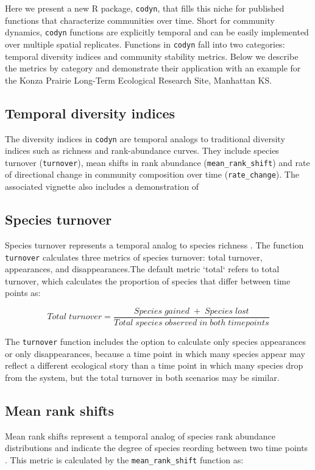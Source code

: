 \documentclass[11pt]{article}
\begin{document}
Here we present a new R package, \texttt{codyn}, that fills this niche for published functions that characterize communities over time. Short for community dynamics, \texttt{codyn} functions are explicitly temporal and can be easily implemented over multiple spatial replicates. Functions in \texttt{codyn} fall into two categories: temporal diversity indices and community stability metrics. Below we describe the metrics by category and demonstrate their application with an example for the Konza Prairie Long-Term Ecological Research Site, Manhattan KS.

\subsection{Temporal diversity indices}

The diversity indices in \texttt{codyn} are temporal analogs to traditional diversity indices such as richness and rank-abundance curves. They include species turnover (\texttt{turnover}), mean shifts in rank abundance (\texttt{mean\_rank\_shift}) \cite{Collins2008} and rate of directional change in community composition over time (\texttt{rate\_change}). The associated vignette also includes a demonstration of 

\subsection{Species turnover}
Species turnover represents a temporal analog to species richness  \cite{MacArthur1963, diamond1969, Collins2008, cleland2013}. The function \texttt{turnover} calculates three metrics of species turnover: total turnover, appearances, and disappearances.The default metric `total` refers to total turnover, which calculates the proportion of species that differ between time points as:

$$ Total\; turnover = \frac{Species\; gained\; +\; Species\; lost}{Total\; species\; observed\; in\; both\; time points} $$

The \texttt{turnover} function includes the option to calculate only species appearances or only disappearances, because a time point in which many species appear may reflect a different ecological story than a time point in which many species drop from the system, but the total turnover in both scenarios may be similar. 

\subsection{Mean rank shifts}
Mean rank shifts represent a temporal analog of species rank abundance distributions and indicate the degree of species reording between two time points \cite{Collins2008}. This metric is calculated by the \texttt{mean\_rank\_shift} function as:
\end{document}
